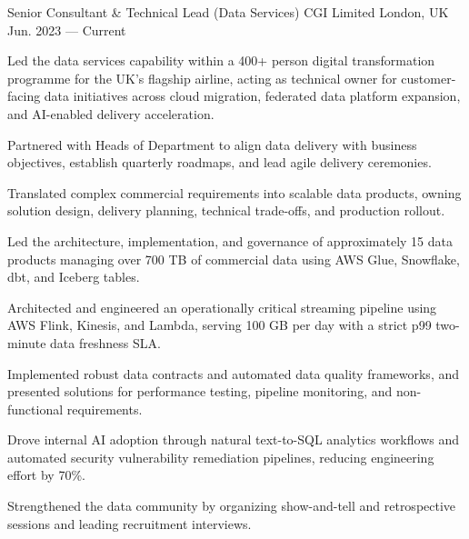 
\begin{cventries}

  \cventry
  {Senior Consultant \& Technical Lead (Data Services)} %
  {CGI Limited} %
  {London, UK} %
  {Jun. 2023 --- Current} %
  {
    \begin{cvitems} %
    \item {Led the data services capability within a 400+ person digital transformation programme for the UK's flagship airline, acting as technical owner for customer-facing data initiatives across cloud migration, federated data platform expansion, and AI-enabled delivery acceleration.}
    \item {Partnered with Heads of Department to align data delivery with business objectives, establish quarterly roadmaps, and lead agile delivery ceremonies.}
    \item {Translated complex commercial requirements into scalable data products, owning solution design, delivery planning, technical trade-offs, and production rollout.}
    \item {Led the architecture, implementation, and governance of approximately 15 data products managing over 700 TB of commercial data using AWS Glue, Snowflake, dbt, and Iceberg tables.}
    \item {Architected and engineered an operationally critical streaming pipeline using AWS Flink, Kinesis, and Lambda, serving 100 GB per day with a strict p99 two-minute data freshness SLA.}
    \item {Implemented robust data contracts and automated data quality frameworks, and presented solutions for performance testing, pipeline monitoring, and non-functional requirements.}
    \item {Drove internal AI adoption through natural text-to-SQL analytics workflows and automated security vulnerability remediation pipelines, reducing engineering effort by 70\%.}
    \item {Strengthened the data community by organizing show-and-tell and retrospective sessions and leading recruitment interviews.}
    \end{cvitems}
  }


\end{cventries}
